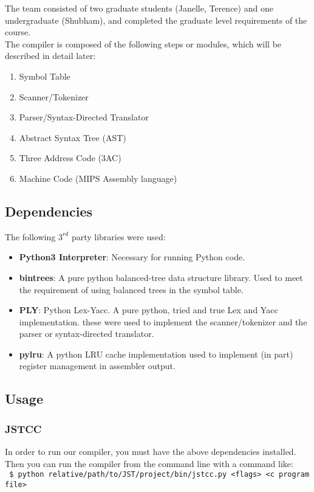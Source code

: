 \documentclass{article}
\begin{document}
\noindent The team consisted of two graduate students (Janelle, Terence) and one
undergraduate (Shubham), and completed the graduate level requirements of the
course.\\

\noindent The compiler is composed of the following steps or modules, which will be 
described in detail later:
  \begin{enumerate}
  \item Symbol Table
  \item Scanner/Tokenizer
  \item Parser/Syntax-Directed Translator
  \item Abstract Syntax Tree (AST)
  \item Three Address Code (3AC)
  \item Machine Code (MIPS Assembly language)
  \end{enumerate}


\subsection{Dependencies}
\noindent The following $3^{rd}$ party libraries were used:
  \begin{itemize}
  \item \textbf{Python3 Interpreter}: Necessary for running Python code.

  \item \textbf{bintrees}: A pure python balanced-tree data structure library.
                            Used to meet the requirement of using balanced
                            trees in the symbol table.

  \item \textbf{PLY}: Python Lex-Yacc. A pure python, tried and true Lex and 
                      Yacc implementation. these were used to implement the
                      scanner/tokenizer and the parser or syntax-directed
                      translator.

  \item \textbf{pylru}: A python LRU cache implementation used to implement (in
                        part) register management in assembler output.
  \end{itemize}

\subsection{Usage}
\subsubsection{JSTCC}
\noindent In order to run our compiler, you must have the above dependencies installed.
Then you can run the compiler from the command line with a command like:\\
\texttt{
\$ python relative/path/to/JST/project/bin/jstcc.py <flags> <c program file>
}\\
\end{document}
